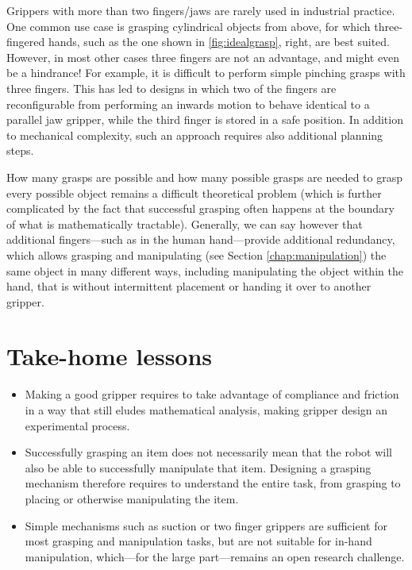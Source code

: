 Grippers with more than two fingers/jaws are rarely used in industrial practice. One common use case is grasping cylindrical objects from above, for which three-fingered hands, such as the one shown in \cref{fig:idealgrasp}, right, are best suited. However, in most other cases three fingers are not an advantage, and might even be a hindrance!
For example, it is difficult to perform simple pinching grasps with three fingers. This has led to designs in which two of the fingers are reconfigurable from performing an inwards motion to behave identical to a parallel jaw gripper, while the third finger is stored in a safe position. In addition to mechanical complexity, such an approach requires also additional planning steps.

How many grasps are possible and how many possible grasps are needed to grasp every possible object remains a difficult theoretical problem (which is further complicated by the fact that successful grasping often happens at the boundary of what is mathematically tractable). Generally, we can say however that additional fingers---such as in the human hand---provide additional redundancy, which allows grasping and manipulating (see Section \ref{chap:manipulation}) the same object in many different ways, including manipulating the object within the hand, that is without intermittent placement or handing it over to another gripper.

\section*{Take-home lessons}
\begin{itemize}
\item Making a good gripper requires to take advantage of compliance and friction in a way that still eludes mathematical analysis, making gripper design an experimental process.
\item Successfully grasping an item does not necessarily mean that the robot will also be able to successfully manipulate that item. Designing a grasping mechanism therefore requires to understand the entire task, from grasping to placing or otherwise manipulating the item. 
\item Simple mechanisms such as suction or two finger grippers are sufficient for most grasping and manipulation tasks, but are not suitable for in-hand manipulation, which---for the large part---remains an open research challenge.
\end{itemize}


